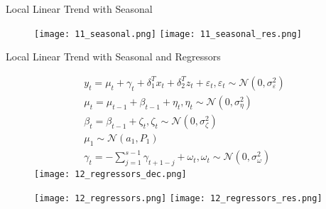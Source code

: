 \documentclass{beamer}
\begin{document}
\begin{frame}[fragile]
\begin{columns}[T]
\begin{column}{.32\textwidth}
\begin{block}{Local Linear Trend with Seasonal}
\begin{figure}[htb]
  \texttt{[image: 11\_seasonal.png]}
\endminipage\hfill
{}
  \texttt{[image: 11\_seasonal\_res.png]}
\endminipage\hfill
\end{figure}

\end{block}

\begin{block}{Local Linear Trend with Seasonal and Regressors}

\begin{figure}[htb]
\begin{gather*}
y_t = \mu_t + \gamma_t + \delta_1^T x_t + \delta_2^T z_t + \varepsilon_t, \varepsilon_t \sim \mathcal{N}(0, \sigma^2_\varepsilon)
\\
\mu_t = \mu_{t-1} + \beta_{t-1} + \eta_t, \eta_t \sim \mathcal{N}(0, \sigma^2_\eta)
\\
\beta_t = \beta_{t-1} + \zeta_t, \zeta_t \sim \mathcal{N}(0, \sigma_\zeta^2)
\\
\mu_1 \sim \mathcal{N}(a_1, P_1) 
\\
\gamma_t = - \sum_{j=1}^{s-1} \gamma_{t+1-j} + \omega_t, \omega_t \sim \mathcal{N}(0, \sigma_\omega^2)
\end{gather*}
\endminipage \hfill
{}
\texttt{[image: 12\_regressors\_dec.png]}
\endminipage\hfill
\end{figure}

\begin{figure}[htb]
  \texttt{[image: 12\_regressors.png]}
\endminipage\hfill
{}
  \texttt{[image: 12\_regressors\_res.png]}
\endminipage\hfill
\end{figure}

\end{block}


\end{column}
\end{columns}



\end{frame}
\end{document}
